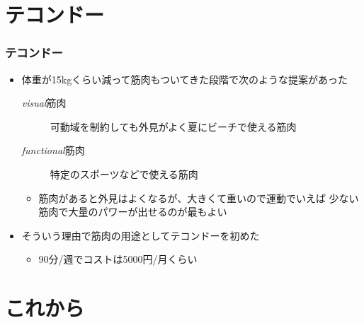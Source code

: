 \section{テコンドー}

\begin{frame}
  \frametitle{テコンドー}

  \pause
  \begin{itemize}
    \item 体重が15kgくらい減って筋肉もついてきた段階で次のような提案があった
    \pause
    \begin{description}
      \item[\textit{visual}筋肉] 
      可動域を制約しても外見がよく夏にビーチで使える筋肉

      \item[\textit{functional}筋肉]
      特定のスポーツなどで使える筋肉
    \end{description}

    \begin{itemize}
      \item 筋肉があると外見はよくなるが、大きくて重いので運動でいえば
      少ない筋肉で大量のパワーが出せるのが最もよい
    \end{itemize}

    \item<+-> そういう理由で筋肉の用途としてテコンドー\cite{taekwondo}を初めた
    \begin{itemize}
      \item 90分/週でコストは5000円/月くらい
    \end{itemize}
  \end{itemize}
\end{frame}

\section{これから}

